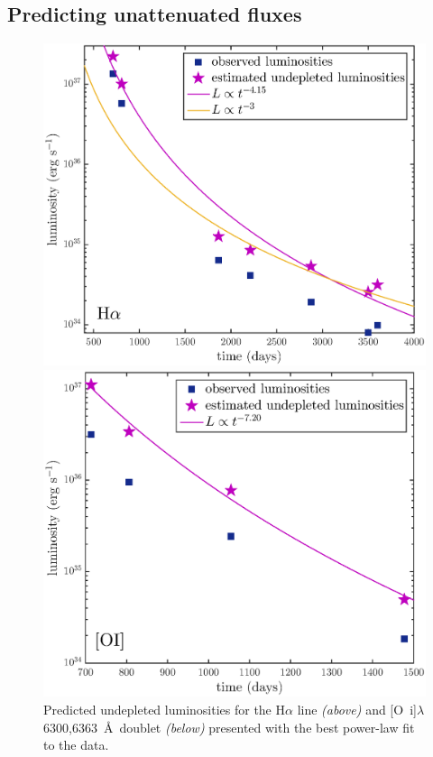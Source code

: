\documentclass[useAMS,usenatbib,usegraphicx]{mnras}
\begin{document}
\subsection{Predicting unattenuated fluxes}
\begin{figure}

\includegraphics[trim =25 10 40 15,clip=true,scale=0.47]{undep_fluxes_Ha}

\includegraphics[trim =25 10 40 15,clip=true,scale=0.486]{undep_lum_OI}


\caption{Predicted undepleted luminosities for the H$\alpha$ line \textit{(above)}  and [O~{\sc i}]$\lambda$6300,6363~\AA\ doublet \textit{(below)} presented with the best power-law fit to the data.}
\label{Ha_undep}

\end{figure}
\end{document}
